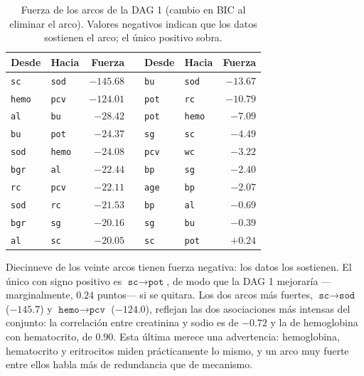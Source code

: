 \documentclass[11pt, a4paper]{article}
\begin{document}
\begin{table}[H]
\centering
\caption{Fuerza de los arcos de la DAG 1 (cambio en BIC al eliminar el arco). Valores negativos
indican que los datos sostienen el arco; el único positivo sobra.}
\label{tab:arcstrength}
\small
\setlength{\tabcolsep}{5pt}
\renewcommand{\arraystretch}{1.08}
\begin{tabular}{l l r c l l r}
\toprule
\textbf{Desde} & \textbf{Hacia} & \textbf{Fuerza} & \phantom{x} &
\textbf{Desde} & \textbf{Hacia} & \textbf{Fuerza} \\
\midrule
\texttt{sc}   & \texttt{sod}  & $-145.68$ & & \texttt{bu}   & \texttt{sod}  & $-13.67$ \\
\texttt{hemo} & \texttt{pcv}  & $-124.01$ & & \texttt{pot}  & \texttt{rc}   & $-10.79$ \\
\texttt{al}   & \texttt{bu}   & $-28.42$  & & \texttt{pot}  & \texttt{hemo} & $-7.09$  \\
\texttt{bu}   & \texttt{pot}  & $-24.37$  & & \texttt{sg}   & \texttt{sc}   & $-4.49$  \\
\texttt{sod}  & \texttt{hemo} & $-24.08$  & & \texttt{pcv}  & \texttt{wc}   & $-3.22$  \\
\texttt{bgr}  & \texttt{al}   & $-22.44$  & & \texttt{bp}   & \texttt{sg}   & $-2.40$  \\
\texttt{rc}   & \texttt{pcv}  & $-22.11$  & & \texttt{age}  & \texttt{bp}   & $-2.07$  \\
\texttt{sod}  & \texttt{rc}   & $-21.53$  & & \texttt{bp}   & \texttt{al}   & $-0.69$  \\
\texttt{bgr}  & \texttt{sg}   & $-20.16$  & & \texttt{sg}   & \texttt{bu}   & $-0.39$  \\
\texttt{al}   & \texttt{sc}   & $-20.05$  & & \texttt{sc}   & \texttt{pot}  & $\mathbf{+0.24}$ \\
\bottomrule
\end{tabular}
\end{table}

Diecinueve de los veinte arcos tienen fuerza negativa: los datos los sostienen. El único con signo
positivo es $\texttt{sc} \rightarrow \texttt{pot}$, de modo que la DAG 1 mejoraría —marginalmente,
$0.24$ puntos— si se quitara. Los dos arcos más fuertes, $\texttt{sc} \rightarrow \texttt{sod}$
($-145.7$) y $\texttt{hemo} \rightarrow \texttt{pcv}$ ($-124.0$), reflejan las dos asociaciones más
intensas del conjunto: la correlación entre creatinina y sodio es de $-0.72$ y la de hemoglobina
con hematocrito, de $0.90$. Esta última merece una advertencia: hemoglobina, hematocrito y
eritrocitos miden prácticamente lo mismo, y un arco muy fuerte entre ellos habla más de
redundancia que de mecanismo.
\end{document}
